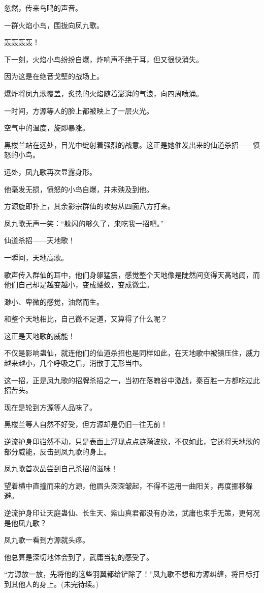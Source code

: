 \begin{this_body}
忽然，传来鸟鸣的声音。

一群火焰小鸟，围拢向凤九歌。

轰轰轰轰！

下一刻，火焰小鸟纷纷自爆，炸响声不绝于耳，但又很快消失。

因为这是在绝音戈壁的战场上。

爆炸将凤九歌覆盖，炙热的火焰随着澎湃的气浪，向四周喷涌。

一时间，方源等人的脸上都被映上了一层火光。

空气中的温度，旋即暴涨。

黑楼兰站在远处，目光中绽射着强烈的战意。这正是她催发出来的仙道杀招——愤怒的小鸟。

远处，凤九歌再次显露身形。

他毫发无损，愤怒的小鸟自爆，并未殃及到他。

方源旋即扑上，其余影宗群仙的攻势从四面八方打来。

凤九歌无声一笑：“躲闪的够久了，来吃我一招吧。”

仙道杀招——天地歌！

一瞬间，天地高歌。

歌声传入群仙的耳中，他们身躯猛震，感觉整个天地像是陡然间变得天高地阔，而他们自己却是越变越小，变成蝼蚁，变成微尘。

渺小、卑微的感觉，油然而生。

和整个天地相比，自己微不足道，又算得了什么呢？

这正是天地歌的威能！

不仅是影响蛊仙，就连他们的仙道杀招也是同样如此，在天地歌中被镇压住，威力越来越小，几个呼吸之后，消散于无形当中。

这一招，正是凤九歌的招牌杀招之一，当初在落魄谷中激战，秦百胜一方都吃过此招苦头。

现在是轮到方源等人品味了。

黑楼兰等人自然不好受，但方源却是仍旧一往无前！

逆流护身印岿然不动，只是表面上浮现点点涟漪波纹，不仅如此，它还将天地歌的部分威能，反击到凤九歌的身上。

凤九歌首次品尝到自己杀招的滋味！

望着横中直撞而来的方源，他眉头深深皱起，不得不运用一曲阳关，再度挪移躲避。

逆流护身印让天庭蛊仙、长生天、紫山真君都没有办法，武庸也束手无策，更何况是他凤九歌？

凤九歌一看到方源就头疼。

他总算是深切地体会到了，武庸当初的感受了。

“方源放一放，先将他的这些羽翼都给铲除了！”凤九歌不想和方源纠缠，将目标打到其他人的身上。(未完待续。)

\end{this_body}


